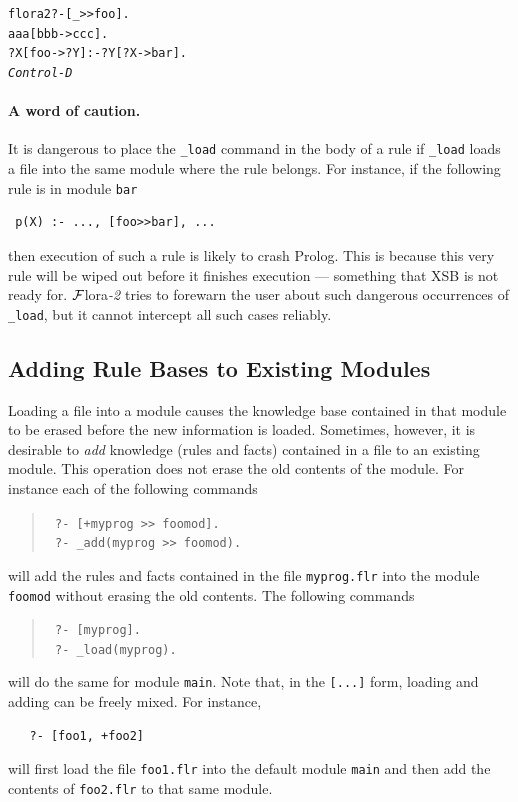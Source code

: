\documentclass[11pt]{article}
\newcommand{\FLORA}{{\mbox{\sc ${\cal F}${lora}\rm\emph{-2}}}\xspace}
\begin{document}
\begin{alltt}
 flora2 ?- [_>>foo].
 aaa[bbb->ccc].
 ?X[foo->?Y] :- ?Y[?X->bar].
 \emph{Control-D}  
\end{alltt}


\paragraph{A word of caution.} It is dangerous to place the {\tt \_load} command
in the body of a rule if {\tt \_load} loads a file into the same module
where the rule belongs. For instance, if the following rule is in module
{\tt bar}  
\begin{verbatim}
 p(X) :- ..., [foo>>bar], ...  
\end{verbatim}
then execution of such a rule is likely to crash Prolog. This is because
this very rule will be wiped out before it finishes execution --- something
that XSB is not ready for. \FLORA tries to forewarn the user about such
dangerous occurrences of {\tt \_load}, but it cannot intercept all such
cases reliably.


\subsection{Adding Rule Bases to Existing Modules}

Loading a file into a module causes the knowledge base contained in that
module to be erased before the new information is loaded. Sometimes,
however, it is desirable to \emph{add} knowledge (rules and facts)
contained in a file to an existing module.
This operation does not erase the old contents of the module.
For instance each of the following commands 

\index{[+file]}
\begin{quote}
  \tt
   ?- [+myprog >> foomod].\\
    \tt
   ?- \_add(myprog >> foomod).
\end{quote}
will add the rules and facts contained in the file {\tt myprog.flr} into the
module {\tt foomod} without erasing the old contents. The following commands
\begin{quote}
  \tt
   ?- [myprog].\\
    \tt
   ?- \_load(myprog).
\end{quote}
will do the same for module {\tt main}. Note that, in the {\tt [...]} form,  
loading and adding can be freely mixed. For instance, 
\begin{verbatim}
   ?- [foo1, +foo2]  
\end{verbatim}
will first load the file {\tt foo1.flr} into the default module {\tt main}
and then add the contents of {\tt foo2.flr} to that same module.
\end{document}
